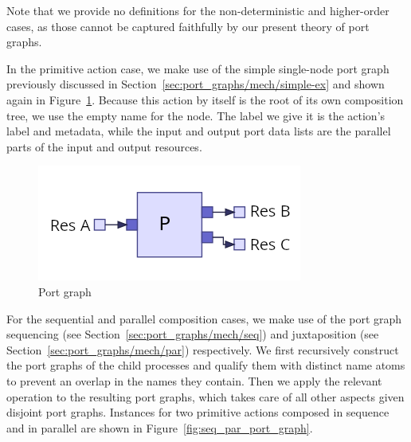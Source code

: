 \documentclass[class=smolathesis,crop=false]{standalone}
\begin{document}
Note that we provide no definitions for the non-deterministic and higher-order cases, as those cannot be captured faithfully by our present theory of port graphs.

In the primitive action case, we make use of the simple single-node port graph previously discussed in Section~\ref{sec:port_graphs/mech/simple-ex} and shown again in Figure~\ref{fig:primitive_port_graph}.
Because this action by itself is the root of its own composition tree, we use the empty name \isa{\isalist{}} for the node.
The label we give it is the action's label and metadata, while the input and output port data lists are the parallel parts of the input and output resources.

\begin{figure}[htbp]
  \centering
  \includegraphics[scale=0.5]{img/node_port_graph.png}
  \caption{Port graph }
  \label{fig:primitive_port_graph}
\end{figure}

For the sequential and parallel composition cases, we make use of the port graph sequencing (see Section~\ref{sec:port_graphs/mech/seq}) and juxtaposition (see Section~\ref{sec:port_graphs/mech/par}) respectively.
We first recursively construct the port graphs of the child processes and qualify them with distinct name atoms to prevent an overlap in the names they contain.
Then we apply the relevant operation to the resulting port graphs, which takes care of all other aspects given disjoint port graphs.
Instances for two primitive actions composed in sequence and in parallel are shown in Figure~\ref{fig:seq_par_port_graph}.
\end{document}
